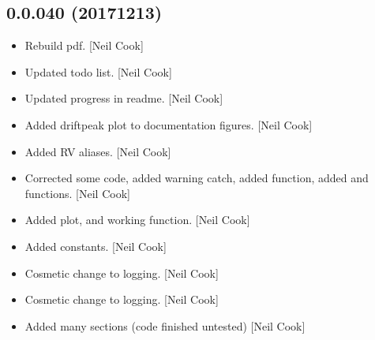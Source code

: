 \documentclass[a4paper,10pt,english]{report}
\begin{document}
\subsection{0.0.040 (2017\sphinxhyphen{}12\sphinxhyphen{}13)}
\label{\detokenize{misc/changelog:id531}}\begin{itemize}
\item {} 
Rebuild pdf. {[}Neil Cook{]}

\item {} 
Updated todo list. {[}Neil Cook{]}

\item {} 
Updated progress in readme. {[}Neil Cook{]}

\item {} 
Added drift\sphinxhyphen{}peak plot to documentation figures. {[}Neil Cook{]}

\item {} 
Added RV aliases. {[}Neil Cook{]}

\item {} 
Corrected some code, added warning catch, added  function,
added  and  functions. {[}Neil Cook{]}

\item {} 
Added  plot,  and working
function. {[}Neil Cook{]}

\item {} 
Added  constants. {[}Neil Cook{]}

\item {} 
Cosmetic change to logging. {[}Neil Cook{]}

\item {} 
Cosmetic change to logging. {[}Neil Cook{]}

\item {} 
Added many sections (code finished \sphinxhyphen{} untested) {[}Neil Cook{]}

\end{itemize}
\end{document}
